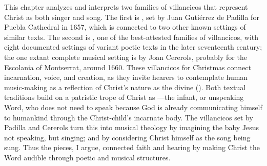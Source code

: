 This chapter analyzes and interprets two families of villancicos that represent
Christ as both singer and song.
The first is , set by Juan Gutiérrez de Padilla
for Puebla Cathedral in 1657, which is connected to two other known settings of
similar texts.
The second is , one of the
best-attested families of villancicos, with eight documented settings of variant
poetic texts in the later seventeenth century; the one extant complete musical
setting is by Joan Cererols, probably for the Escolania of Montserrat, around
1660.
These villancicos for Christmas connect incarnation, voice, and creation, as
they invite hearers to contemplate human music-making as a reflection of
Christ's nature as the divine  ().
Both textual traditions build on a patristic trope of Christ as
---the infant, or unspeaking Word, who does not need to
speak because God is already communicating himself to humankind through the
Christ-child's incarnate body.
The villancicos set by Padilla and Cererols turn this into musical theology by
imagining the baby Jesus not speaking, but singing; and by considering Christ
himself as the song being sung.
Thus the pieces, I argue, connected faith and hearing by making Christ the Word
audible through poetic and musical structures.

